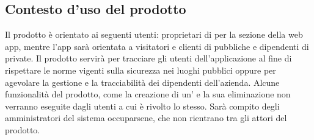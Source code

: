 \subsection{Contesto d'uso del prodotto}
Il prodotto è orientato ai seguenti utenti: proprietari di  per la sezione della web app, mentre l'app sarà orientata a visitatori e clienti di  pubbliche e dipendenti di  private.
Il prodotto servirà per tracciare gli utenti dell'applicazione al fine di rispettare le norme vigenti sulla sicurezza nei luoghi pubblici oppure per agevolare la gestione e la tracciabilità dei dipendenti dell'azienda.
Alcune funzionalità del prodotto, come la creazione di un' e la sua eliminazione non verranno eseguite dagli utenti a cui è rivolto lo stesso. Sarà compito degli amministratori del sistema \NomeProgetto{} occuparsene, che non rientrano tra gli attori del prodotto.

